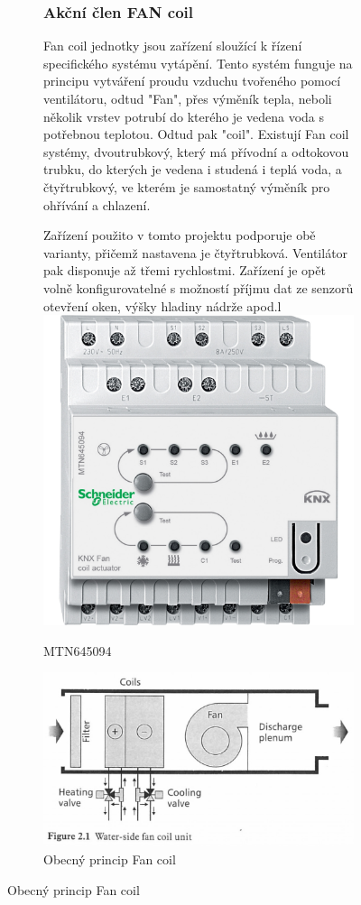 \documentclass[12pt, a4paper,
twoside,        %
openright
]{report}
\begin{document}
\begin{figure}[h]
\centering
\begin{subfigure}{0.9\textwidth}
	\subsubsection{Akční člen FAN coil}
	Fan coil jednotky jsou zařízení sloužící k řízení specifického systému vytápění. Tento systém funguje na principu vytváření proudu vzduchu tvořeného pomocí ventilátoru, odtud "Fan", přes výměník tepla, neboli několik vrstev potrubí do kterého je vedena voda s potřebnou teplotou. Odtud pak "coil". Existují Fan coil systémy, dvoutrubkový, který má přívodní a odtokovou trubku, do kterých je vedena i studená i teplá voda, a čtyřtrubkový, ve kterém je samostatný výměník pro ohřívání a chlazení.


	\noindent Zařízení použito v tomto projektu podporuje obě varianty, přičemž nastavena je čtyřtrubková. Ventilátor pak disponuje až třemi rychlostmi. Zařízení je opět volně konfigurovatelné s možností příjmu dat ze senzorů otevření oken, výšky hladiny nádrže apod.l
		\centering
		\includegraphics[scale=0.09]{image/MTN645094.jpg}
		\caption{MTN645094}
		\label{image:5}
		\includegraphics[scale=0.2]{image/fancoil.jpg}
		\caption{Obecný princip Fan coil}
		\label{img:6}
\end{subfigure}


\end{figure}
\end{document}
